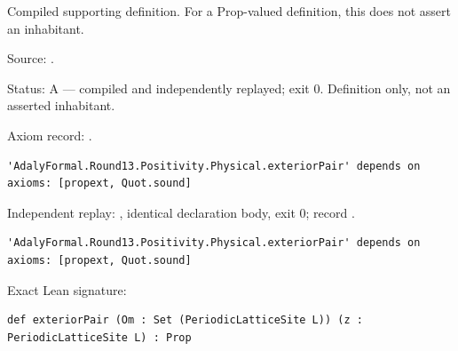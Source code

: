 \begin{definition}[bp-470]
\label{bp-470}
\uses{}
\leanok
Compiled supporting definition. For a Prop-valued definition, this does not assert an inhabitant.

\par Source: \texttt{}.
\par Status: A — compiled and independently replayed; exit 0. Definition only, not an asserted inhabitant.
\par Axiom record: \texttt{}.
\begin{verbatim}
'AdalyFormal.Round13.Positivity.Physical.exteriorPair' depends on axioms: [propext, Quot.sound]
\end{verbatim}
\par Independent replay: \texttt{}, identical declaration body, exit 0; record \texttt{}.
\begin{verbatim}
'AdalyFormal.Round13.Positivity.Physical.exteriorPair' depends on axioms: [propext, Quot.sound]
\end{verbatim}
\par Exact Lean signature:
\begin{verbatim}
def exteriorPair (Om : Set (PeriodicLatticeSite L)) (z : PeriodicLatticeSite L) : Prop
\end{verbatim}
\end{definition}

